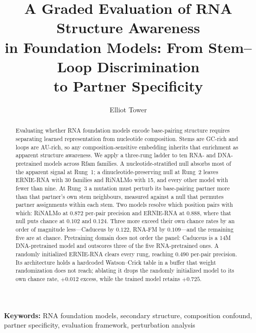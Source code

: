 \documentclass[11pt]{article}
\title{A Graded Evaluation of RNA Structure Awareness\\in Foundation Models: From Stem--Loop Discrimination\\to Partner Specificity}
\author{Elliot Tower}
\affil{Independent researcher \\ \texttt{elliot@elliottower.ai}}
\date{}
\begin{document}
\maketitle

\noindent\textbf{Keywords:} RNA foundation models, secondary structure, composition confound, partner specificity, evaluation framework, perturbation analysis

\begin{abstract}
Evaluating whether RNA foundation models encode base-pairing structure requires
separating learned representation from nucleotide composition. Stems are GC-rich
and loops are AU-rich, so any composition-sensitive embedding inherits that
enrichment as apparent structure awareness. We apply a three-rung ladder to ten
RNA- and DNA-pretrained models across \panelN{} Rfam families. A
nucleotide-stratified null absorbs most of the apparent signal at Rung~1; a
dinucleotide-preserving null at Rung~2 leaves ERNIE-RNA with 30 families and
RiNALMo with 15, and every other model with fewer than nine. At Rung~3 a
mutation must perturb its base-pairing partner more than that partner's own stem
neighbours, measured against a null that permutes partner assignments within
each stem. Two models resolve which position pairs with which: RiNALMo at
$0.872$ per-pair precision and ERNIE-RNA at $0.888$, where that null puts chance
at $0.102$ and $0.124$. Three more exceed their own chance rates by an order of
magnitude less---Caduceus by $0.122$, RNA-FM by $0.109$---and the remaining five
are at chance. Pretraining domain does not order the panel: Caduceus is a 14M
DNA-pretrained model and outscores three of the five RNA-pretrained ones.
A randomly initialized ERNIE-RNA clears every rung, reaching $0.490$ per-pair
precision. Its architecture holds a hardcoded Watson--Crick table in a buffer
that weight randomization does not reach; ablating it drops the randomly
initialized model to its own chance rate, $+0.012$ excess, while the trained
model retains $+0.725$.
\end{abstract}

\end{document}
